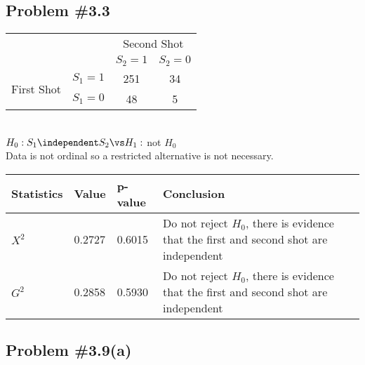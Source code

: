 \documentclass[12pt, letterpaper]{article}
\begin{document}
\subsection*{Problem {\#}3.3}  

\begin{wraptable}{l}{3in} 
\vspace{-12pt} 
\begin{tabular}{c l cc }
							&			& \multicolumn{2}{c}{Second Shot} \\
							&			& $S_2 = 1$	& $S_2 = 0$ 	\\ \cline{3-4} 
\multirow{2}{*}{First Shot} & $S_1 = 1$	& \multicolumn{1}{|c}{251}		& \multicolumn{1}{|c|}{34}\\ \cline{3-4} 
							& $S_1 = 0$ 	& \multicolumn{1}{|c}{48}		& \multicolumn{1}{|c|}{5} \\ \cline{3-4}
\end{tabular}
\vspace{-60pt} 
\end{wraptable} 

\quad \\[12pt]
$H_0: S_1 \independent S_2 \vs H_1:$ not $H_0$  
\\[36pt]
Data is not ordinal so a restricted alternative is not necessary.  

\begin{tabu}{X[l, 1] X[l, 1] X[l, 1] X[l, 4]}
\textbf{Statistics} & \textbf{Value} & \textbf{p-value} & \textbf{Conclusion} \\ \hline 
$X^2$ & 0.2727 & 0.6015 & Do not reject $H_0$, there is evidence that the first and second shot are independent \\ \hline
$G^2$ & 0.2858 & 0.5930 & Do not reject $H_0$, there is evidence that the first and second shot are independent \\ \hline 
\end{tabu}

\subsection*{Problem {\#}3.9(a)}
\end{document}
